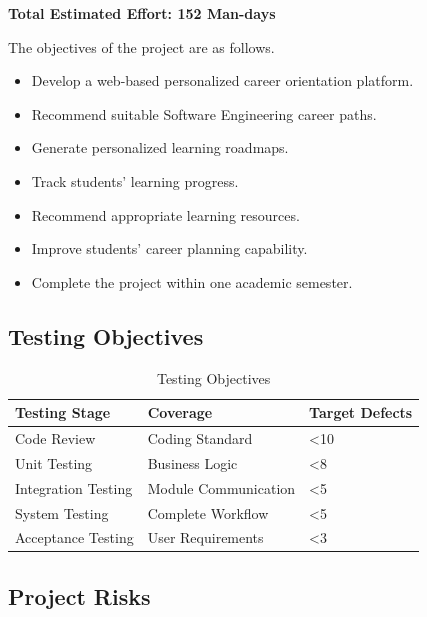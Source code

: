 \textbf{Total Estimated Effort: 152 Man-days}

The objectives of the project are as follows.

\begin{itemize}
\item Develop a web-based personalized career orientation platform.
\item Recommend suitable Software Engineering career paths.
\item Generate personalized learning roadmaps.
\item Track students' learning progress.
\item Recommend appropriate learning resources.
\item Improve students' career planning capability.
\item Complete the project within one academic semester.
\end{itemize}

\subsection{Testing Objectives}

\begin{table}[H]
\centering
\caption{Testing Objectives}
\label{tab:testing}

\begin{tabular}{|l|l|l|}
\hline
\textbf{Testing Stage} & \textbf{Coverage} & \textbf{Target Defects}\\
\hline
Code Review & Coding Standard & <10\\
\hline
Unit Testing & Business Logic & <8\\
\hline
Integration Testing & Module Communication & <5\\
\hline
System Testing & Complete Workflow & <5\\
\hline
Acceptance Testing & User Requirements & <3\\
\hline
\end{tabular}
\end{table}

\subsection{Project Risks}

